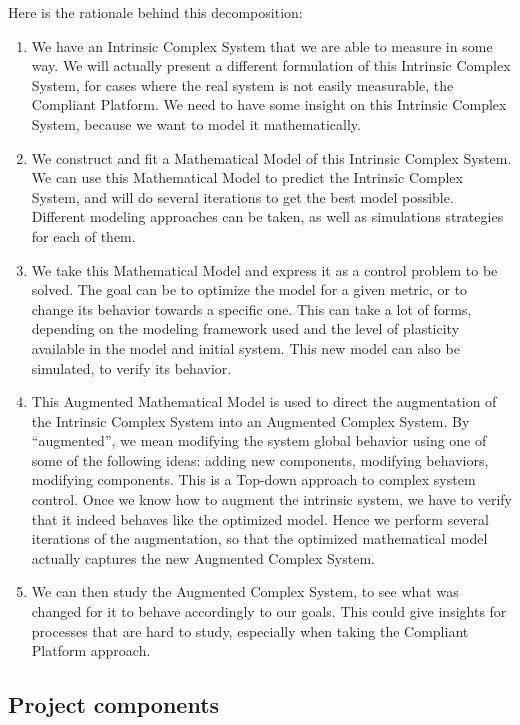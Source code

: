 Here is the rationale behind this decomposition:
\begin{enumerate}
	\item We have an Intrinsic Complex System that we are able to measure in some way. We will actually present a different formulation of this Intrinsic Complex System, for cases where the real system is not easily measurable, the Compliant Platform. We need to have some insight on this Intrinsic Complex System, because we want to model it mathematically.
	\item We construct and fit a Mathematical Model of this Intrinsic Complex System. We can use this Mathematical Model to predict the Intrinsic Complex System, and will do several iterations to get the best model possible. Different modeling approaches can be taken, as well as simulations strategies for each of them.
	\item We take this Mathematical Model and express it as a control problem to be solved. The goal can be to optimize the model for a given metric, or to change its behavior towards a specific one. This can take a lot of forms, depending on the modeling framework used and the level of plasticity available in the model and initial system. This new model can also be simulated, to verify its behavior.
	\item This Augmented Mathematical Model is used to direct the augmentation of the Intrinsic Complex System into an Augmented Complex System. By ``augmented'', we mean modifying the system global behavior using one of some of the following ideas: adding new components, modifying behaviors, modifying components. This is a Top-down approach to complex system control. Once we know how to augment the intrinsic system, we have to verify that it indeed behaves like the optimized model. Hence we perform several iterations of the augmentation, so that the optimized mathematical model actually captures the new Augmented Complex System.
	\item We can then study the Augmented Complex System, to see what was changed for it to behave accordingly to our goals. This could give insights for processes that are hard to study, especially when taking the Compliant Platform approach.
\end{enumerate}


\subsection{Project components} %
\label{sub:project_components}

